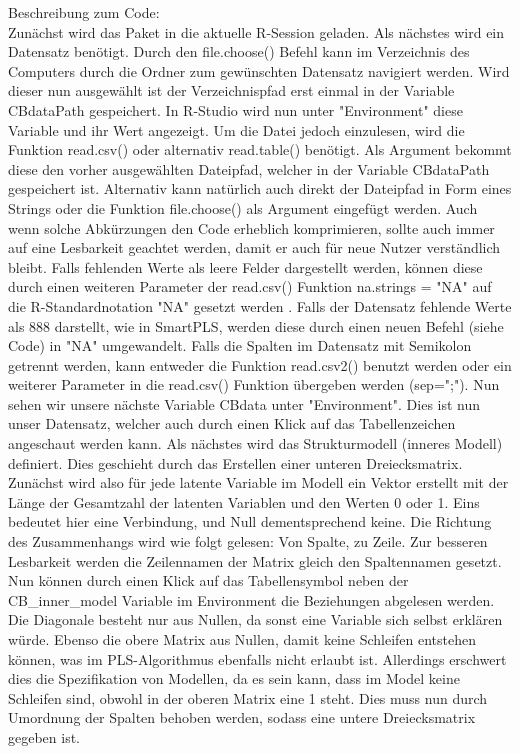 \documentclass{article}\usepackage[]{graphicx}\usepackage[]{color}
\begin{document}
Beschreibung zum Code:\\
Zunächst wird das Paket in die aktuelle R-Session geladen. Als nächstes wird ein Datensatz benötigt. Durch den file.choose() Befehl kann im Verzeichnis des Computers durch die Ordner zum gewünschten Datensatz navigiert werden. Wird dieser nun ausgewählt ist der Verzeichnispfad erst einmal in der Variable CBdataPath gespeichert. In R-Studio wird nun unter "Environment" diese Variable und ihr Wert angezeigt. Um die Datei jedoch einzulesen, wird die Funktion read.csv() oder alternativ read.table() benötigt. Als Argument bekommt diese den vorher ausgewählten Dateipfad, welcher in der Variable CBdataPath gespeichert ist. Alternativ kann natürlich auch direkt der Dateipfad in Form eines Strings oder die Funktion file.choose() als Argument eingefügt werden. Auch wenn solche Abkürzungen den Code erheblich komprimieren, sollte auch immer auf eine Lesbarkeit geachtet werden, damit er auch für neue Nutzer verständlich bleibt. Falls fehlenden Werte als leere Felder dargestellt werden, können diese durch einen weiteren Parameter der read.csv() Funktion na.strings = "NA" auf die R-Standardnotation "NA" gesetzt werden . Falls der Datensatz fehlende Werte als 888 darstellt, wie in SmartPLS, werden diese durch einen neuen Befehl (siehe Code) in "NA" umgewandelt. Falls die Spalten im Datensatz mit Semikolon getrennt werden, kann entweder die Funktion read.csv2() benutzt werden oder ein weiterer Parameter in die read.csv() Funktion übergeben werden (sep=";"). Nun sehen wir unsere nächste Variable CBdata unter "Environment". Dies ist nun unser Datensatz, welcher auch durch einen Klick auf das Tabellenzeichen angeschaut werden kann. Als nächstes wird das Strukturmodell (inneres Modell) definiert. Dies geschieht durch das Erstellen einer unteren Dreiecksmatrix. Zunächst wird also für jede latente Variable im Modell ein Vektor erstellt mit der Länge der Gesamtzahl der latenten Variablen und den Werten 0 oder 1. Eins bedeutet hier eine Verbindung, und Null dementsprechend keine. Die Richtung des Zusammenhangs wird wie folgt gelesen: Von Spalte, zu Zeile. Zur besseren Lesbarkeit werden die Zeilennamen der Matrix gleich den Spaltennamen gesetzt. Nun können durch einen Klick auf das Tabellensymbol neben der CB\_inner\_model Variable im Environment die Beziehungen abgelesen werden. Die Diagonale besteht nur aus Nullen, da sonst eine Variable sich selbst erklären würde. Ebenso die obere Matrix aus Nullen, damit keine Schleifen entstehen können, was im PLS-Algorithmus ebenfalls nicht erlaubt ist. Allerdings erschwert dies die Spezifikation von Modellen, da es sein kann, dass im Model keine Schleifen sind, obwohl in der oberen Matrix eine 1 steht. Dies muss nun durch Umordnung der Spalten behoben werden, sodass eine untere Dreiecksmatrix gegeben ist.
\end{document}
